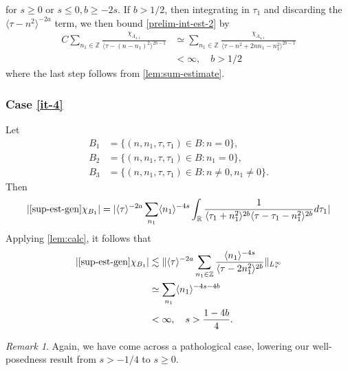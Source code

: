 \documentclass[12pt,reqno]{amsart}
\numberwithin{equation}{section}  %
\numberwithin{figure}{section}
\newcommand{\rr}{\mathbb{R}}
\newcommand{\zz}{\mathbb{Z}}
\theoremstyle{plain}
\theoremstyle{definition}
\theoremstyle{remark}
\newtheorem{remark}{Remark}
\begin{document}
%
%
for $s \ge 0$ or $s \le 0, b \ge -2s$. If $b > 1/2$, then integrating in
$\tau_{1}$ and discarding the  $\langle \tau - n^{2}  \rangle ^{-2a}$ term, we
then bound \eqref{prelim-int-est-2} by
%
%
\begin{equation*}
\begin{split}
  C \sum_{n_{1} \in \zz} \frac{\chi_{A_{4,1}}}{\langle \tau - (n -
  n_{1})^{2} \rangle ^{2b -1}}
  & \simeq
  \sum_{n_{1} \in \zz} \frac{\chi_{A_{4,1}}}{\langle \tau - n^{2} +
  2nn_{1} - n_{1}^{2}
  \rangle ^{2b -1}}
  \\
  & < \infty, \quad b > 1/2
\end{split}
\end{equation*}
%
%
where the last step follows from  \autoref{lem:sum-estimate}.
\subsubsection{Case \eqref{it-4}} 
\label{sssec:case-it-4}
Let 
%
%
\begin{align*}
B_1&=\{(n, n_1, \tau, \tau_1)\in B: n=0\},\\
B_2&=\{(n, n_1, \tau, \tau_1)\in B: n_1 = 0 \},\\
B_3&=\{(n, n_1, \tau, \tau_1)\in B: n \neq 0, n_1 \neq 0 \}.
\end{align*} 
%
%
Then 
%
%
\begin{equation}
\begin{split}
  |  \eqref{sup-est-gen} \chi_{B_{1}}| = | \langle \tau \rangle ^{-2a} \sum_{n_{1}} \langle
  n_{1}\rangle ^{-4s} \int_{\rr} \frac{1}{\langle \tau_{1} + n_{1}^{2} \rangle ^{2b}\langle
  \tau - \tau_{1} - n_{1}^{2}\rangle ^{2b}}d \tau_{1} |
\end{split}
\end{equation}
Applying \autoref{lem:calc}, it follows that
%
\begin{equation*}
\begin{split}
  |\eqref{sup-est-gen} \chi_{B_{1}} |  & \lesssim \| \langle \tau \rangle ^{-2a} \sum_{n_{1} \in \zz} \frac{\langle n_{1} \rangle
  ^{-4s}}{ \langle \tau - 2n_{1}^{2}  \rangle ^{2b}} \|_{L^{\infty}_{\tau}}
  \\
  & \simeq \sum_{n_{1}} \langle n_{1} \rangle ^{-4s - 4b}
  \\
  & < \infty, \quad s > \frac{1-4b}{4}.
\end{split}
\end{equation*}
%
%
%
%
\begin{framed}
\begin{remark}
Again, we have come across a pathological case, lowering our well-posedness
result from $s > -1/4$ to $s \ge 0$. 
%
\end{remark}
\end{framed}
\end{document}
